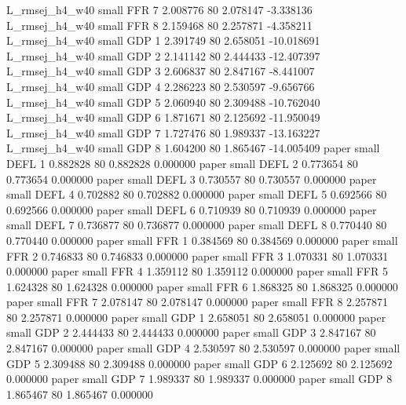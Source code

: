 L_rmsej_h4_w40      small      FFR                 7 2.008776 80       2.078147          -3.338136
L_rmsej_h4_w40      small      FFR                 8 2.159468 80       2.257871          -4.358211
L_rmsej_h4_w40      small      GDP                 1 2.391749 80       2.658051         -10.018691
L_rmsej_h4_w40      small      GDP                 2 2.141142 80       2.444433         -12.407397
L_rmsej_h4_w40      small      GDP                 3 2.606837 80       2.847167          -8.441007
L_rmsej_h4_w40      small      GDP                 4 2.286223 80       2.530597          -9.656766
L_rmsej_h4_w40      small      GDP                 5 2.060940 80       2.309488         -10.762040
L_rmsej_h4_w40      small      GDP                 6 1.871671 80       2.125692         -11.950049
L_rmsej_h4_w40      small      GDP                 7 1.727476 80       1.989337         -13.163227
L_rmsej_h4_w40      small      GDP                 8 1.604200 80       1.865467         -14.005409
         paper      small     DEFL                 1 0.882828 80       0.882828           0.000000
         paper      small     DEFL                 2 0.773654 80       0.773654           0.000000
         paper      small     DEFL                 3 0.730557 80       0.730557           0.000000
         paper      small     DEFL                 4 0.702882 80       0.702882           0.000000
         paper      small     DEFL                 5 0.692566 80       0.692566           0.000000
         paper      small     DEFL                 6 0.710939 80       0.710939           0.000000
         paper      small     DEFL                 7 0.736877 80       0.736877           0.000000
         paper      small     DEFL                 8 0.770440 80       0.770440           0.000000
         paper      small      FFR                 1 0.384569 80       0.384569           0.000000
         paper      small      FFR                 2 0.746833 80       0.746833           0.000000
         paper      small      FFR                 3 1.070331 80       1.070331           0.000000
         paper      small      FFR                 4 1.359112 80       1.359112           0.000000
         paper      small      FFR                 5 1.624328 80       1.624328           0.000000
         paper      small      FFR                 6 1.868325 80       1.868325           0.000000
         paper      small      FFR                 7 2.078147 80       2.078147           0.000000
         paper      small      FFR                 8 2.257871 80       2.257871           0.000000
         paper      small      GDP                 1 2.658051 80       2.658051           0.000000
         paper      small      GDP                 2 2.444433 80       2.444433           0.000000
         paper      small      GDP                 3 2.847167 80       2.847167           0.000000
         paper      small      GDP                 4 2.530597 80       2.530597           0.000000
         paper      small      GDP                 5 2.309488 80       2.309488           0.000000
         paper      small      GDP                 6 2.125692 80       2.125692           0.000000
         paper      small      GDP                 7 1.989337 80       1.989337           0.000000
         paper      small      GDP                 8 1.865467 80       1.865467           0.000000